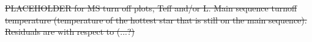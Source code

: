 \documentclass[useAMS,usenatbib]{mnras}
\providecommand{\DIFdel}[1]{{\protect\color{red}\sout{#1}}}                      %
\providecommand{\DIFdelbegin}{} %
\providecommand{\DIFdelend}{} %
\providecommand{\DIFdelFL}[1]{\DIFdel{#1}} %
\providecommand{\DIFdelbeginFL}{} %
\providecommand{\DIFdelendFL}{} %
\newcommand{\DIFscaledelfig}{0.5}
\newlength{\DIFdelgraphicswidth} %
\newlength{\DIFdelgraphicsheight} %
\newcommand{\DIFdelincludegraphics}[2][]{%
\sbox{\DIFdelgraphicsbox}{\DIFOincludegraphics[#1]{#2}}%
\settoboxwidth{\DIFdelgraphicswidth}{\DIFdelgraphicsbox} %
\settoboxtotalheight{\DIFdelgraphicsheight}{\DIFdelgraphicsbox} %
\scalebox{\DIFscaledelfig}{%
\parbox[b]{\DIFdelgraphicswidth}{\usebox{\DIFdelgraphicsbox}\\[-\baselineskip] \rule{\DIFdelgraphicswidth}{0em}}\llap{\resizebox{\DIFdelgraphicswidth}{\DIFdelgraphicsheight}{%
\setlength{\unitlength}{\DIFdelgraphicswidth}%
\begin{picture}(1,1)%
\thicklines\linethickness{2pt} %
{\color[rgb]{1,0,0}\put(0,0){\framebox(1,1){}}}%
{\color[rgb]{1,0,0}\put(0,0){\line( 1,1){1}}}%
{\color[rgb]{1,0,0}\put(0,1){\line(1,-1){1}}}%
\end{picture}%
}\hspace*{3pt}}} %
} %
\DeclareRobustCommand{\DIFdelbegin}{\DIFOdelbegin \let\includegraphics\DIFdelincludegraphics} %
\DeclareRobustCommand{\DIFdelend}{\DIFOaddend \let\includegraphics\DIFOincludegraphics} %
\DeclareRobustCommand{\DIFdelbeginFL}{\DIFOdelbeginFL \let\includegraphics\DIFdelincludegraphics} %
\DeclareRobustCommand{\DIFdelendFL}{\DIFOaddendFL \let\includegraphics\DIFOincludegraphics} %
\begin{document}
\DIFdelbegin %
{%
\DIFdelFL{PLACEHOLDER for MS turn off plots, Teff and/or L.
    Main sequence turnoff temperature (temperature of the hottest star that is still on the main sequence). Residuals are with respect to (...?)
    }%
}
\DIFdelendFL %

\DIFdelbeginFL %
\DIFdelend %
\end{document}
